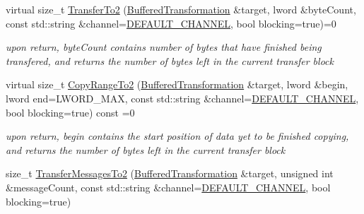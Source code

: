  \begin{DoxyCompactItemize}
\item 
\hypertarget{class_buffered_transformation_a27ac15af3ef43c5ad1e9db5812025fcd}{
virtual size\_\-t \hyperlink{class_buffered_transformation_a27ac15af3ef43c5ad1e9db5812025fcd}{TransferTo2} (\hyperlink{class_buffered_transformation}{BufferedTransformation} \&target, lword \&byteCount, const std::string \&channel=\hyperlink{cryptlib_8h_a6f1917f54ea8c2a45de6e08c5087c8de}{DEFAULT\_\-CHANNEL}, bool blocking=true)=0}
\label{class_buffered_transformation_a27ac15af3ef43c5ad1e9db5812025fcd}

\begin{DoxyCompactList}\small\item\em upon return, byteCount contains number of bytes that have finished being transfered, and returns the number of bytes left in the current transfer block \item\end{DoxyCompactList}\item 
\hypertarget{class_buffered_transformation_a7f90ef36f633c97c1ae519b800527d8e}{
virtual size\_\-t \hyperlink{class_buffered_transformation_a7f90ef36f633c97c1ae519b800527d8e}{CopyRangeTo2} (\hyperlink{class_buffered_transformation}{BufferedTransformation} \&target, lword \&begin, lword end=LWORD\_\-MAX, const std::string \&channel=\hyperlink{cryptlib_8h_a6f1917f54ea8c2a45de6e08c5087c8de}{DEFAULT\_\-CHANNEL}, bool blocking=true) const =0}
\label{class_buffered_transformation_a7f90ef36f633c97c1ae519b800527d8e}

\begin{DoxyCompactList}\small\item\em upon return, begin contains the start position of data yet to be finished copying, and returns the number of bytes left in the current transfer block \item\end{DoxyCompactList}\item 
\hypertarget{class_buffered_transformation_a1a70058989762156c376d7ffa5cb303e}{
size\_\-t \hyperlink{class_buffered_transformation_a1a70058989762156c376d7ffa5cb303e}{TransferMessagesTo2} (\hyperlink{class_buffered_transformation}{BufferedTransformation} \&target, unsigned int \&messageCount, const std::string \&channel=\hyperlink{cryptlib_8h_a6f1917f54ea8c2a45de6e08c5087c8de}{DEFAULT\_\-CHANNEL}, bool blocking=true)}
\label{class_buffered_transformation_a1a70058989762156c376d7ffa5cb303e}


\end{DoxyCompactItemize}
